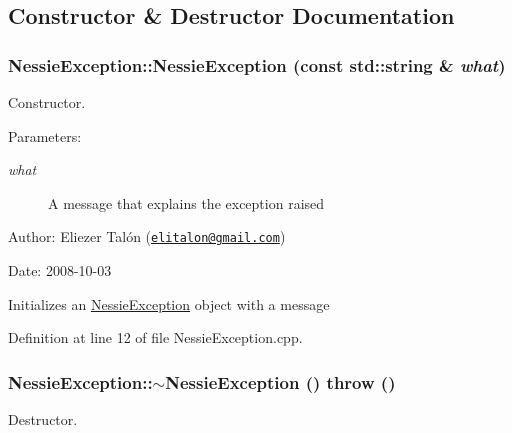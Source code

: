 \subsection{Constructor \& Destructor Documentation}
\hypertarget{class_nessie_exception_80c86c892438045635bf6a99da17e859}{
\subsubsection[NessieException]{\setlength{\rightskip}{0pt plus 5cm}NessieException::NessieException (const std::string \& {\em what})}}
\label{class_nessie_exception_80c86c892438045635bf6a99da17e859}


Constructor. 

\begin{Desc}
\item[Parameters:]
\begin{description}
\item[{\em what}]A message that explains the exception raised\end{description}
\end{Desc}
\begin{Desc}
\item[Author:]Eliezer Talón (\href{mailto:elitalon@gmail.com}{\tt elitalon@gmail.com}) \end{Desc}
\begin{Desc}
\item[Date:]2008-10-03\end{Desc}
Initializes an \hyperlink{class_nessie_exception}{NessieException} object with a message 

Definition at line 12 of file NessieException.cpp.\hypertarget{class_nessie_exception_19f44d2725dd53e2f10505a88e5773f2}{
\subsubsection[$\sim$NessieException]{\setlength{\rightskip}{0pt plus 5cm}NessieException::$\sim$NessieException ()  throw ()}}
\label{class_nessie_exception_19f44d2725dd53e2f10505a88e5773f2}


Destructor. 


